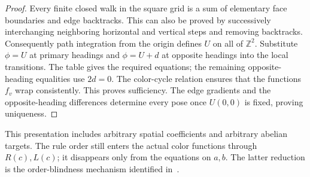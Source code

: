 \documentclass[11pt]{article}
\theoremstyle{definition}
\newcommand{\Z}{\mathbb Z}
\begin{document}
\begin{proof}
Every finite closed walk in the square grid is a sum of elementary face
boundaries and edge backtracks. This can also be proved by successively
interchanging neighboring horizontal and vertical steps and removing
backtracks. Consequently path integration from the origin defines $U$ on all
of $\Z^2$. Substitute $\phi=U$ at primary headings and $\phi=U+d$ at opposite
headings into the local transitions. The table gives the required equations;
the remaining opposite-heading equalities use $2d=0$. The color-cycle relation
ensures that the functions $f_v$ wrap consistently. This proves sufficiency.
The edge gradients and the opposite-heading differences determine every pose
once $U(0,0)$ is fixed, proving uniqueness.
\end{proof}

This presentation includes arbitrary spatial coefficients and arbitrary
abelian targets. The rule order still enters the actual color functions through
$R(c),L(c)$; it disappears only from the equations on $a,b$. The latter
reduction is the order-blindness mechanism identified in~\cite{mcnamara}.
\end{document}
